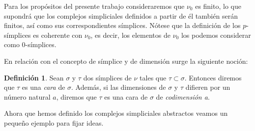 \documentclass[12pt, a4paper, twoside]{book}
\numberwithin{equation}{section}
\theoremstyle{definition}
\newtheorem{defi}{Definición}[section]
\theoremstyle{remark}
\theoremstyle{plain}
\begin{document}
	Para los propósitos del presente trabajo consideraremos que 
	{\Large $\nu$}$_{0}$ es finito, lo que supondrá que los complejos 
	simpliciales definidos a partir de él también serán finitos, así como 
	sus correspondientes símplices. Nótese que la definición de los 
	$p$-símplices es coherente con {\Large $\nu$}$_{0}$, es decir, los 
	elementos de {\Large $\nu$}$_{0}$ los podemos considerar como 
	$0$-símplices. 
	
	En relación con el concepto de símplice y de dimensión surge la 
	siguiente noción: 

	\begin{defi}
		Sean $\sigma$ y $\tau$ dos símplices de {\Large $\nu$} tales 
		que $\tau \subset \sigma$. Entonces diremos que $\tau$ es una 
		\textit{cara} de $\sigma$. Además, si las dimensiones de 
		$\sigma$ y $\tau$ difieren por un número natural $a$, 
		diremos que $\tau$ es una cara de $\sigma$ de 
		\textit{codimensión a}.
	\end{defi}

	Ahora que hemos definido los complejos simpliciales abstractos veamos 
	un pequeño ejemplo para fijar ideas.
\end{document}
